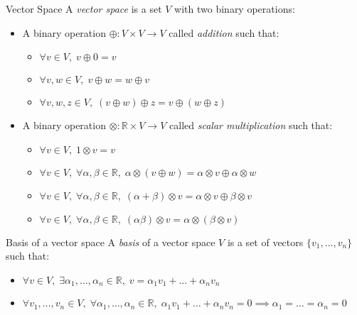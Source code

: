 \begin{definition}{Vector Space}{}
    A \emph{vector space} is a set $V$ with two binary operations:
    \begin{itemize}
        \item A binary operation $\oplus : V \times V \to V$ called \emph{addition}
            such that:
            \begin{itemize}
                \item $\forall v \in V,\; v \oplus 0 = v$
                \item $\forall v,w \in V,\; v \oplus w = w \oplus v$
                \item $\forall v,w,z \in V,\; (v \oplus w) \oplus z = v \oplus (w \oplus z)$
            \end{itemize}
        \item A binary operation $\otimes : \mathbb{R} \times V \to V$ called
            \emph{scalar multiplication} such that:
            \begin{itemize}
                \item $\forall v \in V,\; 1 \otimes v = v$
                \item $\forall v \in V,\; \forall \alpha,\beta \in \mathbb{R},\;
                    \alpha \otimes (v \oplus w) = \alpha \otimes v \oplus \alpha \otimes w$
                \item $\forall v \in V,\; \forall \alpha,\beta \in \mathbb{R},\;
                    (\alpha + \beta) \otimes v = \alpha \otimes v \oplus \beta \otimes v$
                \item $\forall v \in V,\; \forall \alpha,\beta \in \mathbb{R},\;
                    (\alpha \beta) \otimes v = \alpha \otimes (\beta \otimes v)$
            \end{itemize}
    \end{itemize}
\end{definition}

\begin{definition}{Basis of a vector space}{}
    A \emph{basis} of a vector space $V$ is a set of vectors $\{v_1,\ldots,v_n\}$
    such that:
    \begin{itemize}
        \item $\forall v \in V,\; \exists \alpha_1,\ldots,\alpha_n \in \mathbb{R},\;
            v = \alpha_1 v_1 + \ldots + \alpha_n v_n$
        \item $\forall v_1,\ldots,v_n \in V,\; \forall \alpha_1,\ldots,\alpha_n \in \mathbb{R},\;
            \alpha_1 v_1 + \ldots + \alpha_n v_n = 0 \implies \alpha_1 = \ldots = \alpha_n = 0$
    \end{itemize}
\end{definition}

